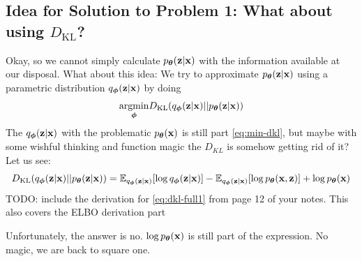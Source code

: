 \documentclass[11pt]{article}
\theoremstyle{definition}
\begin{document}
\subsection{Idea for Solution to Problem 1: What about using $D_{\text{KL}}$?}
Okay, so we cannot simply calculate $p_{\boldsymbol{\theta}}(\mathbf{z}|\mathbf{x})$ with the information available at our disposal. What about this idea: We try to approximate $p_{\boldsymbol{\theta}}(\mathbf{z}|\mathbf{x})$ using a parametric distribution $q_{\boldsymbol{\phi}}(\mathbf{z}|\mathbf{x})$ by doing
\begin{equation}
	\underset{\boldsymbol{\phi}}{\mathrm{argmin}} D_{\text{KL}}(q_{\boldsymbol{\phi}}(\mathbf{z}|\mathbf{x})||p_{\boldsymbol{\theta}}(\mathbf{z}|\mathbf{x}))
	\label{eq:min-dkl}
\end{equation}
The $q_{\boldsymbol{\phi}}(\mathbf{z}|\mathbf{x})$ with the problematic $p_{\boldsymbol{\theta}}(\mathbf{x})$ is still part \autoref{eq:min-dkl}, but maybe with some wishful thinking and function magic the $D_{KL}$ is somehow getting rid of it? Let us see:
\begin{equation}
	D_{\text{KL}}(q_{\boldsymbol{\phi}}(\mathbf{z}|\mathbf{x})||p_{\boldsymbol{\theta}}(\mathbf{z}|\mathbf{x})) = \mathbb{E}_{q_{\boldsymbol{\phi}}(\mathbf{z}|\mathbf{x})}[\log q_{\boldsymbol{\phi}}(\mathbf{z}|\mathbf{x})] - \mathbb{E}_{q_{\boldsymbol{\phi}}(\mathbf{z}|\mathbf{x})}[\log p_{\boldsymbol{\theta}}(\mathbf{x},\mathbf{z})] + \log p_{\boldsymbol{\theta}}(\mathbf{x})
	\label{eq:dkl-full1}
\end{equation}
TODO: include the derivation for \autoref{eq:dkl-full1} from page 12 of your notes. This also covers the ELBO derivation part  \par
Unfortunately, the answer is no. $\log p_{\boldsymbol{\theta}}(\mathbf{x})$ is still part of the expression. No magic, we are back to square one.
\end{document}
